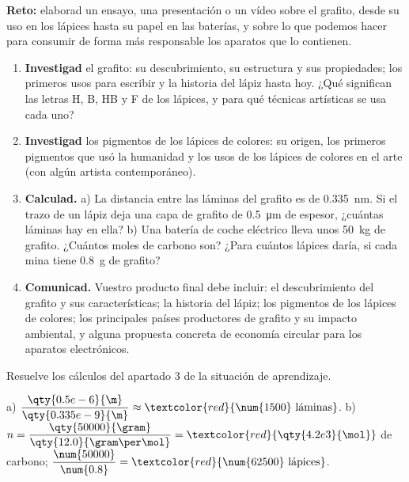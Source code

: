 \begin{marker}
    \textbf{Reto:} elaborad un ensayo, una presentación o un vídeo sobre el grafito, desde su uso en los lápices hasta su papel en
    las baterías, y sobre lo que podemos hacer para consumir de forma más responsable los aparatos que lo contienen.
\end{marker}

\begin{enumerate}[label=\numberballred]
    \item \textbf{Investigad} el grafito: su descubrimiento, su estructura y sus propiedades; los primeros usos para escribir y la
    historia del lápiz hasta hoy. ¿Qué significan las letras H, B, HB y F de los lápices, y para qué técnicas artísticas se usa
    cada uno?
    \item \textbf{Investigad} los pigmentos de los lápices de colores: su origen, los primeros pigmentos que usó la humanidad y
    los usos de los lápices de colores en el arte (con algún artista contemporáneo).
    \item \textbf{Calculad.} a) La distancia entre las láminas del grafito es de \qty{0.335}{\nm}. Si el trazo de un lápiz deja
    una capa de grafito de \qty{0.5}{\micro\m} de espesor, ¿cuántas láminas hay en ella? b) Una batería de coche eléctrico lleva
    unos \qty{50}{\kilo\gram} de grafito. ¿Cuántos moles de carbono son? ¿Para cuántos lápices daría, si cada mina tiene
    \qty{0.8}{\gram} de grafito?
    \item \textbf{Comunicad.} Vuestro producto final debe incluir: el descubrimiento del grafito y sus características; la
    historia del lápiz; los pigmentos de los lápices de colores; los principales países productores de grafito y su impacto
    ambiental, y alguna propuesta concreta de economía circular para los aparatos electrónicos.
\end{enumerate}

\begin{exercise}
    Resuelve los cálculos del apartado 3 de la situación de aprendizaje.
    \begin{solu}
        a) \(\dfrac{\qty{0.5e-6}{\m}}{\qty{0.335e-9}{\m}} \approx \textcolor{red}{\num{1500} \text{ láminas}}\).
        b) \(n = \dfrac{\qty{50000}{\gram}}{\qty{12.0}{\gram\per\mol}} = \textcolor{red}{\qty{4.2e3}{\mol}}\) de carbono;
        \(\dfrac{\num{50000}}{\num{0.8}} = \textcolor{red}{\num{62500} \text{ lápices}}\).
    \end{solu}
\end{exercise}
